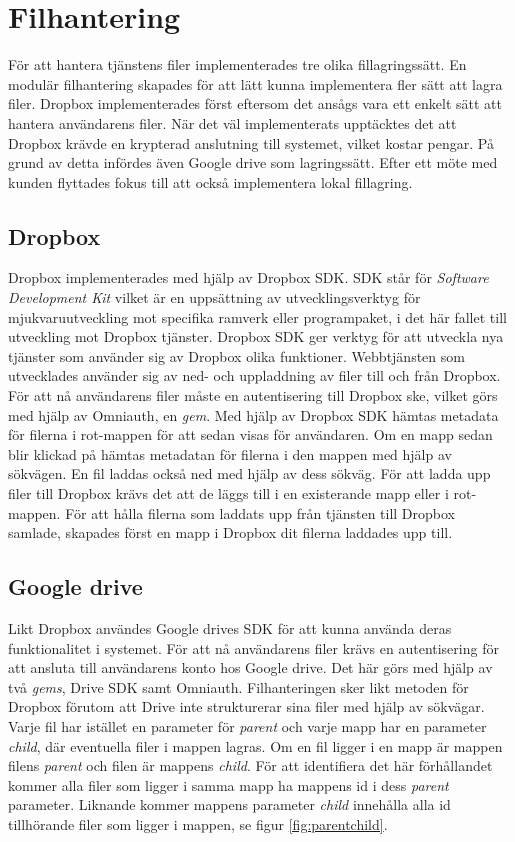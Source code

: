 \documentclass[a4paper,12pt,oneside,final]{extbook}
\begin{document}
\section{Filhantering}
För att hantera tjänstens filer implementerades tre olika fillagringssätt. En modulär filhantering skapades för att lätt kunna implementera fler sätt att lagra filer. Dropbox implementerades först eftersom det ansågs vara ett enkelt sätt att hantera användarens filer. När det väl implementerats upptäcktes det att Dropbox krävde en krypterad anslutning till systemet, vilket kostar pengar. På grund av detta infördes även Google drive som lagringssätt. Efter ett möte med kunden flyttades fokus till att också implementera lokal fillagring.

\subsection{Dropbox}
Dropbox implementerades med hjälp av Dropbox SDK. SDK står för \textit{Software Development Kit} vilket är en uppsättning av utvecklingsverktyg för mjukvaruutveckling mot specifika ramverk eller programpaket, i det här fallet till utveckling mot Dropbox tjänster. Dropbox SDK ger verktyg för att utveckla nya tjänster som använder sig av Dropbox olika funktioner. Webbtjänsten som utvecklades använder sig av ned- och uppladdning av filer till och från Dropbox. För att nå användarens filer måste en autentisering till Dropbox ske, vilket görs med hjälp av Omniauth, en \textit{gem}. Med hjälp av Dropbox SDK hämtas metadata för filerna i rot-mappen för att sedan visas för användaren. Om en mapp sedan blir klickad på hämtas metadatan för filerna i den mappen med hjälp av sökvägen. En fil laddas också ned med hjälp av dess sökväg. För att ladda upp filer till Dropbox krävs det att de läggs till i en existerande mapp eller i rot-mappen. För att hålla filerna som laddats upp från tjänsten till Dropbox samlade, skapades först en mapp i Dropbox dit filerna laddades upp till.

\subsection{Google drive}
Likt Dropbox användes Google drives SDK för att kunna använda deras funktionalitet i systemet. För att nå användarens filer krävs en autentisering för att ansluta till användarens konto hos Google drive. Det här görs med hjälp av två \textit{gems}, Drive SDK samt Omniauth. Filhanteringen sker likt metoden för Dropbox förutom att Drive inte strukturerar sina filer med hjälp av sökvägar. Varje fil har istället en parameter för \textit{parent} och varje mapp har en parameter \textit{child}, där eventuella filer i mappen lagras. Om en fil ligger i en mapp är mappen filens \textit{parent} och filen är mappens \textit{child}. För att identifiera det här förhållandet kommer alla filer som ligger i samma mapp ha mappens id i dess \textit{parent} parameter. Liknande kommer mappens parameter \textit{child} innehålla alla id tillhörande filer som ligger i mappen, se figur \ref{fig:parentchild}.
\end{document}
